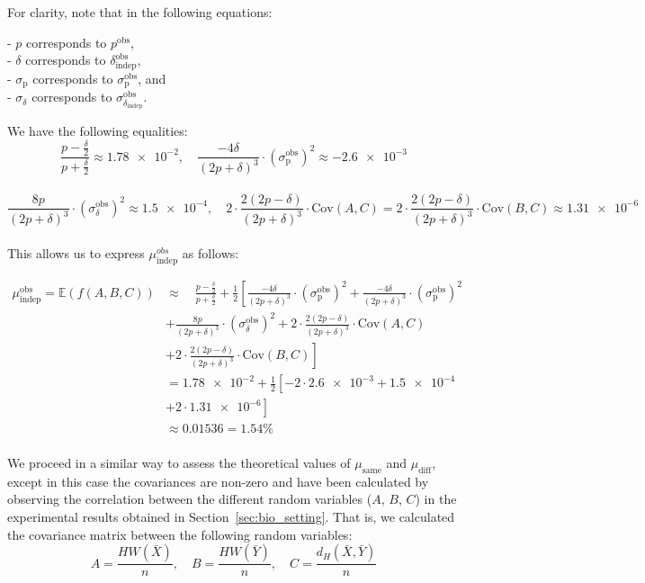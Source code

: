 For clarity, note that in the following equations:

- \(p\) corresponds to \(p^{\text{obs}}\),\\
- \(\delta\) corresponds to \(\delta_{\text{indep}}^{\text{obs}}\),\\
- \(\sigma_{\text{p}}\) corresponds to \(\sigma_{\text{p}}^{\text{obs}}\), and\\
- \(\sigma_\delta\) corresponds to \(\sigma_{\delta_{\text{indep}}}^{\text{obs}}\).

We have the following equalities:
 \[
    \frac{p - \frac{\delta}{2}}{p + \frac{\delta}{2}} \approx \num{1.78e-2}, \quad \frac{-4\delta}{(2p + \delta)^3}\cdot({\sigma^{\text{obs}}_{\text{p}}})^2 \approx -\num{2.6e-3}
 \]\\
 \[
    \frac{8p}{(2p + \delta)^3}\cdot({\sigma^\text{obs}_\delta})^2 \approx \num{1.5e-4}, \quad  2\cdot\frac{2(2p - \delta)}{(2p + \delta)^3}\cdot\text{Cov}(A,C) = 2\cdot\frac{2(2p - \delta)}{(2p + \delta)^3}\cdot\text{Cov}(B,C) \approx \num{1.31e-6}
 \]\\

This allows us to express \( \mu_{\text{indep}}^{obs} \) as follows:


\begin{equation}
    \begin{aligned}
    \mu_{\text{indep}}^{\text{obs}} = \mathbb{E}(f(A,B,C)) &\approx \quad \frac{p - \frac{\delta}{2}}{p + \frac{\delta}{2}} + \frac{1}{2} \left[ \frac{-4\delta}{(2p + \delta)^3}\cdot({\sigma^\text{obs}_{\text{p}}})^2 + \frac{-4\delta}{(2p + \delta)^3}\cdot({\sigma^\text{obs}_{\text{p}}})^2 \right. \\[2mm]
    & \left. + \frac{8p}{(2p + \delta)^3}\cdot({\sigma^\text{obs}_\delta})^2 + 2\cdot\frac{2(2p - \delta)}{(2p + \delta)^3}\cdot\text{Cov}(A,C) \right. \\[2mm]
    & \left. + 2\cdot\frac{2(2p - \delta)}{(2p + \delta)^3}\cdot\text{Cov}(B,C) \right]\\[6mm]
    & = \num{1.78e-2} + \frac{1}{2} \left[ -2\cdot\num{2.6e-3} + \num{1.5e-4}  \right. \\[2mm]
    & \left. + 2\cdot\num{1.31e-6} \right] \\[6mm]
    & \approx 0.01536 = 1.54\%
    \end{aligned}
    \label{eq:mu_indep}
\end{equation}\\

We proceed in a similar way to assess the theoretical values of $\mu_{\text{same}}$ and $\mu_{\text{diff}}$, except in this case the covariances are non-zero and have been calculated by observing the correlation between the different random variables (\(A\), \(B\), \(C\)) in the experimental results obtained in Section~\ref{sec:bio_setting}. That is, we calculated the covariance matrix between the following random variables:
\[
A = \frac{HW(\bar{X})}{n}, \quad B = \frac{HW(\bar{Y})}{n}, \quad C = \frac{d_H(\bar{X}, \bar{Y})}{n}
\]

